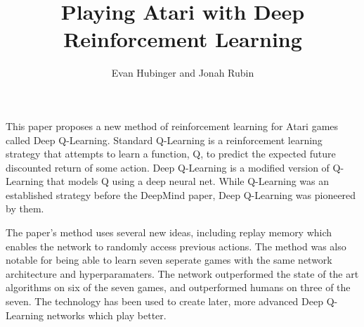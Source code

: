 \documentclass[12pt,letterpaper]{article}
\title{Playing Atari with Deep Reinforcement Learning}
\author{Evan Hubinger and Jonah Rubin}
\begin{document}
\maketitle

This paper proposes a new method of reinforcement learning for Atari games called Deep Q-Learning. Standard Q-Learning is a reinforcement learning strategy that attempts to learn a function, Q, to predict the expected future discounted return of some action. Deep Q-Learning is a modified version of Q-Learning that models Q using a deep neural net. While Q-Learning was an established strategy before the DeepMind paper, Deep Q-Learning was pioneered by them.

The paper's method uses several new ideas, including replay memory which enables the network to randomly access previous actions. The method was also notable for being able to learn seven seperate games with the same network architecture and hyperparamaters. The network outperformed the state of the art algorithms on six of the seven games, and outperformed humans on three of the seven. The technology has been used to create later, more advanced Deep Q-Learning networks which play better.
\end{document}
